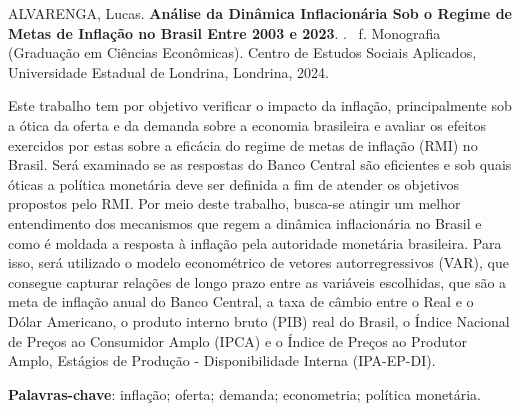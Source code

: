 \documentclass[12pt,oneside,a4paper,chapter=TITLE,english,brazil,sumario=abnt-6027-2012]{abntex2}
\begin{document}
\setlength{\absparsep}{18pt} %
\begin{resumo}

	\noindent
	ALVARENGA, Lucas. {\bfseries Análise da Dinâmica Inflacionária Sob o Regime de Metas de Inflação no Brasil Entre 2003 e 2023}. \imprimirdata. \ztotpages \, f. Monografia (Graduação em Ciências Econômicas). Centro de Estudos Sociais Aplicados, Universidade Estadual de Londrina, Londrina, 2024.
	
	Este trabalho tem por objetivo verificar o impacto da inflação, principalmente sob a ótica da oferta e da demanda sobre a economia brasileira e avaliar os efeitos exercidos por estas sobre a eficácia do regime de metas de inflação (RMI) no Brasil. Será examinado se as respostas do Banco Central são eficientes e sob quais óticas a política monetária deve ser definida a fim de atender os objetivos propostos pelo RMI. Por meio deste trabalho, busca-se atingir um melhor entendimento dos mecanismos que regem a dinâmica inflacionária no Brasil e como é moldada a resposta à inflação pela autoridade monetária brasileira. Para isso, será utilizado o modelo econométrico de vetores autorregressivos (VAR), que consegue capturar relações de longo prazo entre as variáveis escolhidas, que são a meta de inflação anual do Banco Central, a taxa de câmbio entre o Real e o Dólar Americano, o produto interno bruto (PIB) real do Brasil, o Índice Nacional de Preços ao Consumidor Amplo (IPCA) e o Índice de Preços ao Produtor Amplo, Estágios de Produção - Disponibilidade Interna (IPA-EP-DI).
	
	\textbf{Palavras-chave}: inflação; oferta; demanda; econometria; política monetária.
\end{resumo}






\end{document}
